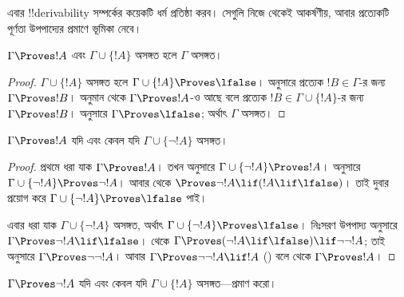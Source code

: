 \documentclass[../../../include/open-logic-section]{subfiles}
\begin{document}
      {}
      {}


এবার !!{derivability} সম্পর্কের কয়েকটি ধর্ম প্রতিষ্ঠা করব। সেগুলি
নিজে থেকেই আকর্ষণীয়, আবার প্রত্যেকটি পূর্ণতা উপপাদ্যের প্রমাণে
ভূমিকা নেবে।

\begin{prop}
  $\Gamma \Proves !A$ এবং $\Gamma \cup \{!A\}$ অসঙ্গত হলে
  $\Gamma$ অসঙ্গত।
\end{prop}

\begin{proof}
  $\Gamma \cup \{!A\}$ অসঙ্গত হলে $\Gamma \cup \{!A\} \Proves
  \lfalse$।  অনুসারে প্রত্যেক $!B \in
  \Gamma$-র জন্য $\Gamma \Proves !B$। অনুমান থেকে $\Gamma \Proves
  !A$-ও আছে বলে প্রত্যেক $!B \in \Gamma \cup \{!A\}$-র জন্য
  $\Gamma \Proves !B$।  অনুসারে
  $\Gamma \Proves \lfalse$; অর্থাৎ $\Gamma$ অসঙ্গত।
\end{proof}

\begin{prop}
$\Gamma \Proves !A$ যদি এবং কেবল যদি $\Gamma \cup \{\lnot !A\}$ অসঙ্গত।
\end{prop}

\begin{proof}
প্রথমে ধরা যাক $\Gamma \Proves !A$। তখন
 অনুসারে $\Gamma \cup \{\lnot !A\}
\Proves !A$।  অনুসারে $\Gamma \cup
\{\lnot !A\} \Proves \lnot !A$। আবার  থেকে
$\Proves \lnot !A \lif (!A \lif \lfalse)$। তাই
 দুবার প্রয়োগ করে $\Gamma \cup \{\lnot !A\}
\Proves \lfalse$ পাই।

এবার ধরা যাক $\Gamma \cup \{\lnot !A\}$ অসঙ্গত, অর্থাৎ $\Gamma
\cup \{\lnot !A\} \Proves \lfalse$। নিঃসরণ উপপাদ্য অনুসারে
$\Gamma \Proves \lnot !A \lif \lfalse$। 
থেকে $\Gamma \Proves (\lnot !A \lif \lfalse) \lif \lnot\lnot !A$;
তাই  অনুসারে $\Gamma \Proves \lnot\lnot !A$।
আবার $\Gamma \Proves \lnot\lnot !A \lif !A$
() বলে  থেকে $\Gamma \Proves
!A$।
\end{proof}

\begin{prob}
$\Gamma \Proves \lnot !A$ যদি এবং কেবল যদি $\Gamma \cup \{!A\}$
অসঙ্গত—প্রমাণ করো।
\end{prob}
\end{document}
